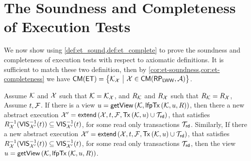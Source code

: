 \section{The Soundness and Completeness of Execution Tests}
\label{app:et_sound_complete}
\label{app:et-sound-complete}
\label{sec:kv-sound-complete-proof}
We now show using \cref{def:et_sound,def:et_complete} to prove the soundness and completeness of execution tests with respect to axiomatic definitions.
It is sufficient to match these two definition, 
then by \cref{cor:et-soundness,cor:et-completeness} we have \( \CMs(\ET) = \Set{\mkvs_\aexec}[\aexec \in \CMa(\RP_{\LWW},\Ax)] \).
\label{sec:spec-proof}

\begin{theorem}
    \label{thm:view-vis-relation}
    Assume \( \mathcal{K} \) and \( \mathcal{X} \) such that \( \mathcal{K} = \mathcal{K}_{\mathcal{X}} \), 
    and \( R_{\mathcal{K}} \) and \( R_{\mathcal{X}} \) such that \( R_{\mathcal{K}} = R_{\mathcal{X}} \),
    Assume \(t, \mathcal{F} \).
    If there is a view \( \vi = \getView[\mkvs,\lfpTx[\mkvs,\vi,\rel]] \),
    then there a new abstract execution \( \aexec' = \extend[\aexec, \txid, \fp, \Tx[\mkvs, \vi] \cup \txidset_\rd] \),
    that satisfies \( R_{\mathcal{X}}^{-1}(\mathsf{VIS}_{\mathcal{X}'}^{-1}(t)) \subseteq \mathsf{VIS}_{\mathcal{X}'}^{-1}(t) \),
    for some read only transactions \( \mathcal{T}_{\mathsf{rd}} \).
    Similarly,
    If there a new abstract execution \( \aexec' = \extend[\aexec, \txid, \fp, \Tx[\mkvs, \vi] \cup \txidset_\rd] \),
    that satisfies \( R_{\mathcal{X}}^{-1}(\mathsf{VIS}_{\mathcal{X}'}^{-1}(t)) \subseteq \mathsf{VIS}_{\mathcal{X}'}^{-1}(t) \),
    for some read only transactions \( \mathcal{T}_{\mathsf{rd}} \),
    then the view \( \vi = \getView[\mkvs,\lfpTx[\mkvs,\vi,\rel]] \).
\end{theorem}

